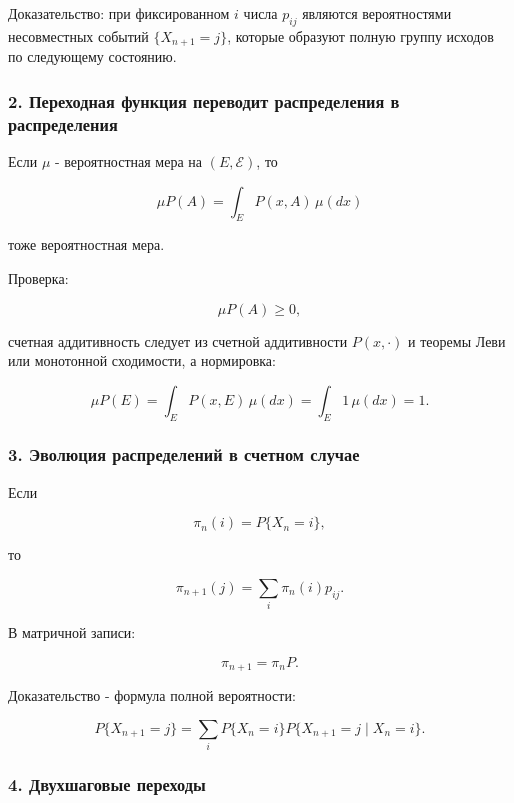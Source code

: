 \documentclass[
  11pt,
  a4paper,
]{article}
\begin{document}
Доказательство: при фиксированном \(i\) числа \(p_{ij}\) являются
вероятностями несовместных событий \(\{X_{n+1}=j\}\), которые образуют
полную группу исходов по следующему состоянию.

\subsubsection{2. Переходная функция переводит распределения в
распределения}\label{ux43fux435ux440ux435ux445ux43eux434ux43dux430ux44f-ux444ux443ux43dux43aux446ux438ux44f-ux43fux435ux440ux435ux432ux43eux434ux438ux442-ux440ux430ux441ux43fux440ux435ux434ux435ux43bux435ux43dux438ux44f-ux432-ux440ux430ux441ux43fux440ux435ux434ux435ux43bux435ux43dux438ux44f}

Если \(\mu\) - вероятностная мера на \((E,\mathcal E)\), то

\[
\mu P(A)=\int_E P(x,A)\,\mu(dx)
\]

тоже вероятностная мера.

Проверка:

\[
\mu P(A)\ge0,
\]

счетная аддитивность следует из счетной аддитивности \(P(x,\cdot)\) и
теоремы Леви или монотонной сходимости, а нормировка:

\[
\mu P(E)=\int_E P(x,E)\,\mu(dx)=\int_E1\,\mu(dx)=1.
\]

\subsubsection{3. Эволюция распределений в счетном
случае}\label{ux44dux432ux43eux43bux44eux446ux438ux44f-ux440ux430ux441ux43fux440ux435ux434ux435ux43bux435ux43dux438ux439-ux432-ux441ux447ux435ux442ux43dux43eux43c-ux441ux43bux443ux447ux430ux435}

Если

\[
\pi_n(i)=P\{X_n=i\},
\]

то

\[
\pi_{n+1}(j)
=
\sum_i\pi_n(i)p_{ij}.
\]

В матричной записи:

\[
\pi_{n+1}=\pi_nP.
\]

Доказательство - формула полной вероятности:

\[
P\{X_{n+1}=j\}
=
\sum_iP\{X_n=i\}P\{X_{n+1}=j\mid X_n=i\}.
\]

\subsubsection{4. Двухшаговые
переходы}\label{ux434ux432ux443ux445ux448ux430ux433ux43eux432ux44bux435-ux43fux435ux440ux435ux445ux43eux434ux44b}
\end{document}
